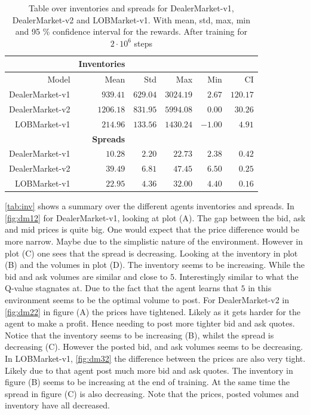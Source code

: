 \documentclass{kththesis}
\theoremstyle{definition}
\begin{document}
\begin{table}[H]
\centering
\caption{Table over inventories and spreads for DealerMarket-v1, DealerMarket-v2 and LOBMarket-v1. With mean, std, max, min and 95 \% confidence interval for the rewards. After training for $2\cdot10^6$ steps}
\label{tab:inv}
\begin{tabular}{rrrrrr}
\hline
 & \textbf{Inventories} \\
  \hline
 Model & Mean & Std & Max & Min & CI \\ 
  \hline
DealerMarket-v1& $939.41$ & $629.04$ & $3024.19$ & $2.67$ & $120.17$  \\
DealerMarket-v2 & $1206.18$ & $831.95$ & $5994.08$ & $0.00$ & $30.26$ \\ 
LOBMarket-v1 & $214.96$ & $133.56$ & $1430.24$ & $-1.00$ & $4.91$ \\ 
   \hline
    & \textbf{Spreads} \\
  \hline
DealerMarket-v1 & $10.28$ & $2.20$ & $22.73$ & $2.38$ & $0.42$ \\
DealerMarket-v2 & $39.49$ & $6.81$ & $47.45$ & $6.50$ & $0.25$ \\ 
LOBMarket-v1  & $22.95$ & $4.36$ & $32.00$ & $4.40$ & $0.16$ \\ 
\hline
\end{tabular}
\end{table}
\autoref{tab:inv} shows a summary over the different agents inventories and spreads. In \autoref{fig:dm12} for DealerMarket-v1, looking at plot (A). The gap between the bid, ask and mid prices is quite big. One would expect that the price difference would be more narrow. Maybe due to the simplistic nature of the environment. However in plot (C) one sees that the spread is decreasing. Looking at the inventory in plot (B) and the volumes in plot (D). The inventory seems to be increasing. While the bid and ask volumes are similar and close to $5$. Interestingly similar to what the Q-value stagnates at. Due to the fact that the agent learns that $5$ in this environment seems to be the optimal volume to post.
\newline
\newline
For DealerMarket-v2 in \autoref{fig:dm22} in figure (A) the prices have tightened. Likely as it gets harder for the agent to make a profit. Hence needing to post more tighter bid and ask quotes. Notice that the inventory seems to be increasing (B), whilst the spread is decreasing (C). However the posted bid, and ask volumes seems to be decreasing. In LOBMarket-v1, \autoref{fig:dm32} the difference between the prices are also very tight. Likely due to that agent post much more bid and ask quotes. The inventory in figure (B) seems to be increasing at the end of training. At the same time the spread in figure (C) is also decreasing. Note that the prices, posted volumes and inventory have all decreased.
\end{document}

